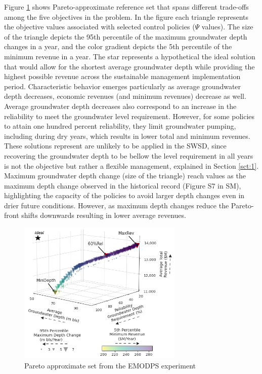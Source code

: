 \documentclass[a4paper,fleqn]{cas-sc}
\begin{document}
Figure \ref{fig:5} shows Pareto-approximate reference set that spans different trade-offs among the five objectives in the problem. In the figure each triangle represents the objective values associated with selected control policies ($\Psi$ values). The size of the triangle depicts the 95th percentile of the maximum groundwater depth changes in a year, and the color gradient depicts the 5th percentile of the minimum revenue in a year. The star represents a hypothetical the ideal solution that would allow for the shortest average groundwater depth while providing the highest possible revenue across the sustainable management implementation period. Characteristic behavior emerges particularly as average groundwater depth decreases, economic revenues (and minimum revenues) decrease as well. Average groundwater depth decreases also correspond to an increase in the reliability to meet the groundwater level requirement. However, for some policies to attain one hundred percent reliability, they limit groundwater pumping, including during dry years, which results in lower total and minimum revenues. These solutions represent are unlikely to be applied in the SWSD, since recovering the groundwater depth to be bellow the level requirement in all years is not the objective but rather a flexible management, explained in Section \ref{sct:1}. Maximum groundwater depth change (size of the triangle) reach values as the maximum depth change observed in the historical record (Figure S7 in SM), highlighting the capacity of the policies to avoid larger depth changes even in drier future conditions. However, as maximum depth changes reduce the Pareto-front shifts downwards resulting in lower average revenues. 

\begin{figure}[htb!]
    \includegraphics[width=0.7\textwidth,center]{./figs/3d_plot.png}
    \caption{Pareto approximate set from the EMODPS experiment} \label{fig:5}
\end{figure}
\end{document}
